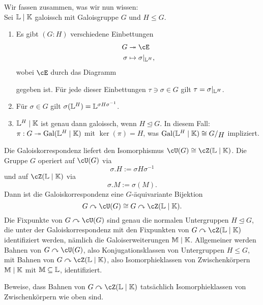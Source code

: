 \begin{bemerkung}
Wir fassen zusammen, was wir nun wissen:\\
Sei $\mathbb{L} \mid \mathbb{K}$ galoissch mit Galoisgruppe $G$ und $H \leq G$.
\begin{enumerate}
\item Es gibt $(G:H)$ verschiedene Einbettungen
\begin{equation}
\begin{split}
G &\twoheadrightarrow \cE\\
\sigma &\mapsto \sigma|_{\L^H},
\end{split}
\end{equation}
wobei $\cE$ durch das Diagramm
\begin{center}
\end{center}
gegeben ist. Für jede dieser Einbettungen $\tau \ni \sigma \in G$ gilt $\tau = \sigma|_{\mathbb{L}^H}$.
\item Für $\sigma \in G$ gilt $\sigma(\mathbb{L}^H)=\mathbb{L}^{\sigma H \sigma^{-1}}$.
\item $\mathbb{L}^H \mid \mathbb{K}$ ist genau dann galoissch, wenn $H\trianglelefteq G$. In diesem Fall: $\pi: G \twoheadrightarrow \operatorname{\text{Gal}}(\mathbb{L}^H \mid \mathbb{K})$ mit $\ker (\pi) = H$, was $\Gal(\L^H \mid \K) \cong \quotient{G}{H}$ impliziert.
\end{enumerate}
\end{bemerkung}
\begin{bemerkung}
Die Galoiskorrespondenz liefert den Isomorphismus $\cU (G) \cong \cZ (\L \mid \K)$. Die Gruppe $G$ operiert auf $\cU(G)$ via
\begin{equation}
\sigma.H := \sigma H \sigma^{-1}
\end{equation}
und auf $\cZ(\L \mid \K)$ via
\begin{equation}
\sigma.M := \sigma(M).
\end{equation}
Dann ist die Galoiskorrespondenz eine $G$-äquivariante Bijektion
\begin{equation}
G \acts \cU(G) \cong G \acts \cZ(\L \mid \K).
\end{equation}
Die Fixpunkte von $G \acts \cU(G)$ sind genau die normalen Untergruppen $H \trianglelefteq G$, die unter der Galoiskorrespondenz mit den Fixpunkten von $G \acts \cZ(\L \mid \K)$ identifiziert werden, nämlich die Galoiserweiterungen $\mathbb{M} \mid \mathbb{K}$. Allgemeiner werden Bahnen von $G \acts \cU(G)$, also Konjugationsklassen von Untergruppen $H \leq G$, mit Bahnen von $G \acts \cZ(\L \mid \K)$, also Isomorphieklassen von Zwischenkörpern $\mathbb{M} \mid \mathbb{K}$ mit $\mathbb{M} \subseteq \mathbb{L}$, identifiziert.
\end{bemerkung}
\begin{übung}
Beweise, dass Bahnen von $G \acts \cZ(\L \mid \K)$ tatsächlich Isomorphieklassen von Zwischenkörpern wie oben sind.
\end{übung}

